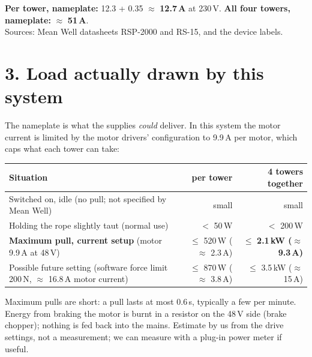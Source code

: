 \documentclass[10pt,a4paper]{article}
\begin{document}
\smallskip
\textbf{Per tower, nameplate:} 12.3 + 0.35 $\approx$ \textbf{12.7\,A} at 230\,V. \quad
\textbf{All four towers, nameplate:} $\approx$ \textbf{51\,A}.\\
Sources: Mean Well datasheets RSP-2000 and RS-15, and the device labels.

\section*{3. Load actually drawn by this system}
The nameplate is what the supplies \emph{could} deliver. In this system the motor current is limited by the motor drivers'
configuration to 9.9\,A per motor, which caps what each tower can take:

\begin{tabularx}{\linewidth}{>{\raggedright\arraybackslash}X r r}
\toprule
Situation & per tower & 4 towers together \\
\midrule
Switched on, idle (no pull; not specified by Mean Well) & small & small \\
Holding the rope slightly taut (normal use) & $<$ 50\,W & $<$ 200\,W \\
\textbf{Maximum pull, current setup} (motor 9.9\,A at 48\,V) & $\le$ 520\,W ($\approx$ 2.3\,A) & $\le$ \textbf{2.1\,kW ($\approx$ 9.3\,A)} \\
Possible future setting (software force limit 200\,N, $\approx$ 16.8\,A motor current) & $\le$ 870\,W ($\approx$ 3.8\,A) & $\le$ 3.5\,kW ($\approx$ 15\,A) \\
\bottomrule
\end{tabularx}

\smallskip
Maximum pulls are short: a pull lasts at most 0.6\,s, typically a few per minute. Energy from braking the motor is burnt in a
resistor on the 48\,V side (brake chopper); nothing is fed back into the mains. Estimate by us from the drive settings, not a
measurement; we can measure with a plug-in power meter if useful.
\end{document}
